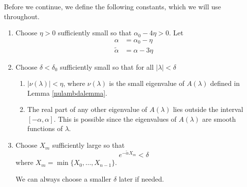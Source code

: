 \documentclass[thesis.tex]{subfiles}
\begin{document}
Before we continue, we define the following constants, which we will use throughout.
\begin{enumerate}
	\item Choose $\eta > 0$ sufficiently small so that $\alpha_0 - 4 \eta > 0$. Let
	\begin{align*}
	\alpha &= \alpha_0 - \eta \\
	\tilde{\alpha} &= \alpha - 3 \eta
	\end{align*}

	\item Choose $\delta < \delta_0$ sufficiently small so that for all $|\lambda| < \delta$
	\begin{enumerate}
		\item $|\nu(\lambda)| < \eta$, where $\nu(\lambda)$ is the small eigenvalue of $A(\lambda)$ defined in Lemma \ref{nulambdalemma}.
		\item The real part of any other eigenvalue of $A(\lambda)$ lies outside the interval $[-\alpha, \alpha]$. This is possible since the eigenvalues of $A(\lambda)$ are smooth functions of $\lambda$.
	\end{enumerate}

	\item Choose $X_m$ sufficiently large so that
	\begin{equation}
	e^{-\tilde{\alpha} X_m} < \delta
	\end{equation}
	where $X_m = \min\{X_0, \dots, X_{n-1}\}$.

	We can always choose a smaller $\delta$ later if needed.
\end{enumerate}
\end{document}

